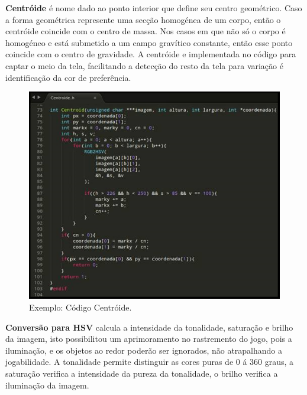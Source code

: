 \documentclass{sciposter}
\begin{document}
\begin{multicols}{3}
\textbf{Centróide} 
é nome dado ao ponto interior que define seu centro geométrico. Caso a forma geométrica represente uma secção homogénea de um corpo, então o centróide coincide com o centro de massa. Nos casos em que não só o corpo é homogéneo e está submetido a um campo gravítico constante, então esse ponto coincide com o centro de gravidade. A centróide e implementada no código para captar o meio da tela, facilitando a detecção do resto da tela para variação é identificação da cor de preferência.

\begin{figure}[!htb]
\centering
\includegraphics[scale=1.7]{centroid.png}
\caption{Exemplo: Código Centróide.}
\end{figure}


\textbf{Conversão para HSV}
calcula a intensidade da tonalidade, saturação e brilho da imagem, isto possibilitou um aprimoramento no rastremento do jogo, pois a iluminação, e os objetos ao redor poderão ser ignorados, não atrapalhando a jogabilidade. A tonalidade permite distinguir as cores puras de 0 á 360 graus, a saturação verifica a intensidade da pureza da tonalidade, o brilho verifica a iluminação da imagem.


\end{multicols}
\end{document}
